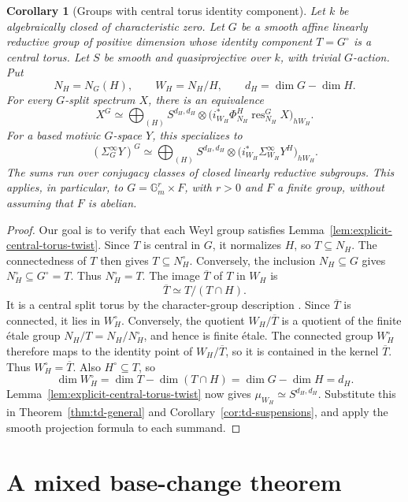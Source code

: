 \documentclass[11pt,reqno]{amsart}
\newtheorem{corollary}[theorem]{Corollary}
\theoremstyle{definition}
\theoremstyle{remark}
\theoremstyle{plain}
\numberwithin{equation}{section}
\newcommand{\Gm}{\mathbb G_m}
\begin{document}
\begin{corollary}[Groups with central torus identity component]
\label{cor:explicit-central-torus-splitting}
Let \(k\) be algebraically closed of characteristic zero.
Let \(G\) be a smooth affine linearly reductive group of
positive dimension whose identity component \(T=G^\circ\)
is a central torus. Let \(S\) be smooth and quasiprojective
over \(k\), with trivial \(G\)-action. Put
\[
 N_H=N_G(H),\qquad W_H=N_H/H,
 \qquad d_H=\dim G-\dim H.
\]
For every \(G\)-split spectrum \(X\), there is an equivalence
\[
 X^G\simeq
 \bigoplus_{(H)} S^{d_H,d_H}\otimes
 \bigl(i_{W_H}^*\Phi_{N_H}^H
             \operatorname{res}_{N_H}^G X\bigr)_{hW_H}.
\]
For a based motivic \(G\)-space \(Y\), this specializes to
\[
 (\Sigma_G^\infty Y)^G\simeq
 \bigoplus_{(H)}S^{d_H,d_H}\otimes
 \bigl(i_{W_H}^*\Sigma_{W_H}^\infty Y^H\bigr)_{hW_H}.
\]
The sums run over conjugacy classes of closed linearly
reductive subgroups. This applies, in particular, to
\(G=\Gm^r\times F\), with \(r>0\) and \(F\) a finite
group, without assuming that \(F\) is abelian.
\end{corollary}

\begin{proof}
Our goal is to verify that each Weyl group satisfies
Lemma~\ref{lem:explicit-central-torus-twist}.
Since \(T\) is central in \(G\), it normalizes \(H\), so
\(T\subseteq N_H\). The connectedness of \(T\) then gives
\(T\subseteq N_H^\circ\). Conversely, the inclusion
\(N_H\subseteq G\) gives \(N_H^\circ\subseteq G^\circ=T\).
Thus \(N_H^\circ=T\).
The image \(\overline T\) of \(T\) in \(W_H\) is
\[
 \overline T\simeq T/(T\cap H).
\]
It is a central split torus by the character-group
description \cite[Theorem~12.9]{MilneAG}.
Since \(\overline T\) is connected, it lies in
\(W_H^\circ\). Conversely, the quotient
\(W_H/\overline T\) is a quotient of the finite \'etale
group \(N_H/T=N_H/N_H^\circ\), and hence is finite \'etale.
The connected group \(W_H^\circ\) therefore maps to the
identity point of \(W_H/\overline T\), so it is contained
in the kernel \(\overline T\). Thus
\(W_H^\circ=\overline T\).
Also \(H^\circ\subseteq T\), so
\[
 \dim W_H^\circ
 =\dim T-\dim(T\cap H)
 =\dim G-\dim H=d_H.
\]
Lemma~\ref{lem:explicit-central-torus-twist} now gives
\(\mu_{W_H}\simeq S^{d_H,d_H}\).
Substitute this in Theorem~\ref{thm:td-general}
and Corollary~\ref{cor:td-suspensions}, and apply the
smooth projection formula to each summand.
\end{proof}


\appendix
\section{A mixed base-change theorem}\label{sec:mixed-bc}
\end{document}
